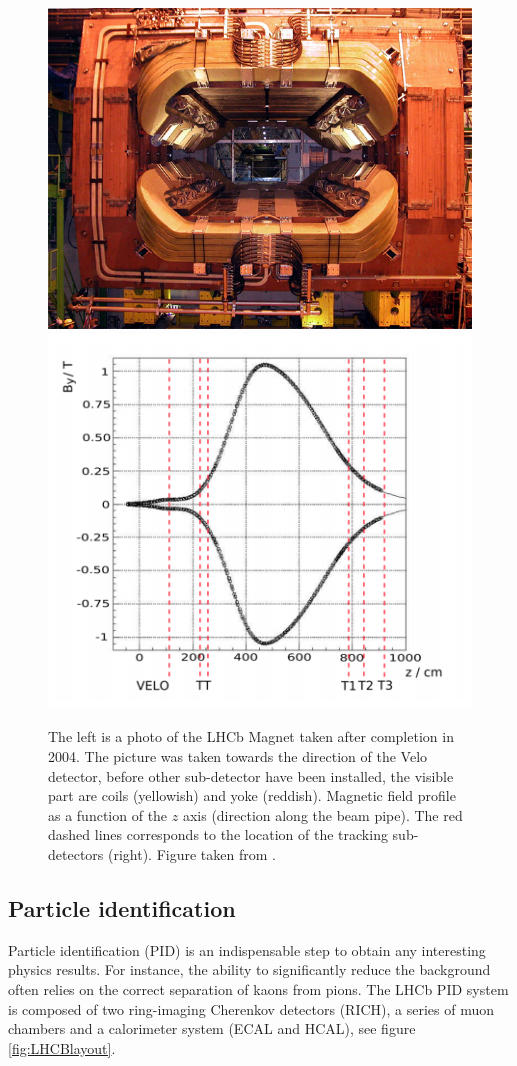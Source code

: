 \begin{figure}[h]
 \begin{center}
  \includegraphics[width=0.49\linewidth]{figures/magnet_photo.jpg}
   \includegraphics[width=0.49\linewidth]{figures/magnet_profile.PNG}
   \caption{The left is a photo of the LHCb Magnet taken after completion in 2004. The picture was taken towards the direction of the Velo detector, before other sub-detector have been installed, the visible part are coils (yellowish) and yoke (reddish). Magnetic field profile as a function of the $z$ axis (direction along the beam pipe). The red dashed lines corresponds to the location of the tracking sub-detectors (right). Figure taken from \cite{lhcb}.   
     \label{fig:magnet}}
 \end{center}
\end{figure}


\subsection{Particle identification}

Particle identification (PID) is an indispensable step to obtain any interesting physics results. For instance, the ability to significantly reduce the background often relies on the correct separation of kaons from pions.
The LHCb PID system is composed of two ring-imaging Cherenkov detectors (RICH), a series of muon chambers and a calorimeter system (ECAL and HCAL), see figure \ref{fig:LHCBlayout}. 


